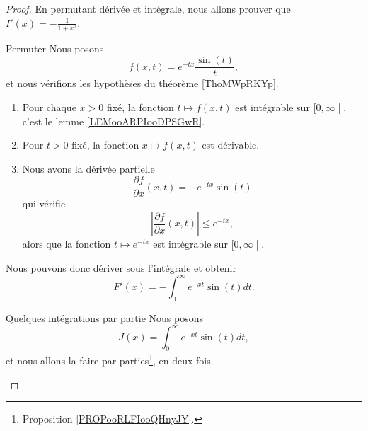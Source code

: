 \begin{proof}
    En permutant dérivée et intégrale, nous allons prouver que \( I'(x)=-\frac{1}{ 1+x^2 }\).

    \begin{subproof}
        \item[Permuter]
            Nous posons
            \begin{equation}
                f(x,t)= e^{-tx}\frac{ \sin(t) }{ t },
            \end{equation}
            et nous vérifions les hypothèses du théorème \ref{ThoMWpRKYp}.

            \begin{enumerate}
                \item
                    Pour chaque \( x>0\) fixé, la fonction \( t\mapsto f(x,t)\) est intégrable sur \( \mathopen[ 0 , \infty \mathclose[\), c'est le lemme \ref{LEMooARPIooDPSGwR}.
                    \item
                        Pour \( t>0\) fixé, la fonction \( x\mapsto f(x,t)\) est dérivable.
                    \item
                        Nous avons la dérivée partielle
                        \begin{equation}
                            \frac{ \partial f }{ \partial x }(x,t)=- e^{-tx}\sin(t)
                        \end{equation}
                        qui vérifie
                        \begin{equation}
                            | \frac{ \partial f }{ \partial x }(x,t) |\leq  e^{-tx},
                        \end{equation}
                        alors que la fonction \( t\mapsto  e^{-tx}\) est intégrable sur \( \mathopen[ 0 , \infty \mathclose[\).
            \end{enumerate}
            Nous pouvons donc dériver sous l'intégrale et obtenir
            \begin{equation}
                F'(x)=-\int_0^{\infty} e^{-xt}\sin(t)dt.
            \end{equation}
        \item[Quelques intégrations par partie]
            Nous posons
            \begin{equation}
                J(x)=\int_0^{\infty} e^{-xt}\sin(t)dt,
            \end{equation}
            et nous allons la faire par parties\footnote{Proposition \ref{PROPooRLFIooQHnyJY}.}, en deux fois.


\end{subproof}
\end{proof}
